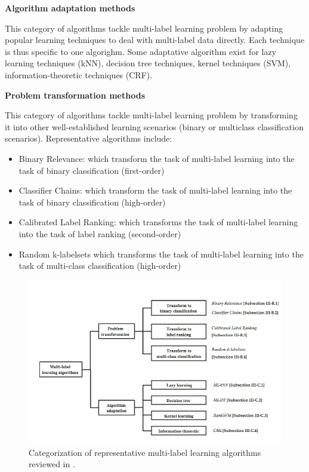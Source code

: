 \textbf{Algorithm adaptation methods}

This category of algorithms tackle multi-label learning problem by adapting popular learning techniques to deal with multi-label data directly. Each technique is thus specific to one algorighm.
Some adaptative algorithm exist for lazy learning techniques (kNN), decision tree techniques, kernel techniques (SVM), information-theoretic techniques (CRF).

\textbf{Problem transformation methods}

This category of algorithms tackle multi-label learning problem by transforming it into other well-established learning scenarios (binary or multiclass classification scenarios). 
Representative algorithms include:
\begin{itemize}
 \item Binary Relevance: which transform the task of multi-label learning into the task of binary classification (first-order)
 \item Classifier Chains: which transform the task of multi-label learning into the task of binary classification (high-order)
 \item Calibrated Label Ranking: which transforms the task of multi-label learning into the task of label ranking (second-order)
 \item Random k-labelsets which transforms the task of multi-label learning into the task of multi-class classification (high-order)
\end{itemize}

\begin{figure}[H]
\centering
\includegraphics[scale=0.6]{./images/machine-learning/multi-label-approaches.png}
\caption{Categorization of representative multi-label learning algorithms reviewed in \cite[this paper]{MultilabelReview}.}
\label{fig:multilabelOverview}
\end{figure}


